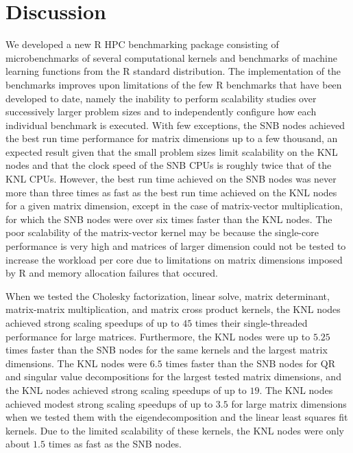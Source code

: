 \section{Discussion} \label{sec:discuss}
We developed a new R HPC benchmarking package consisting of microbenchmarks of
  several computational kernels and benchmarks of machine learning functions
  from the R standard distribution.
The implementation of the benchmarks improves upon limitations of the few R
  benchmarks that have been developed to date, namely the inability to perform
  scalability studies over successively larger problem sizes and to
  independently configure how each individual benchmark is executed.
With few exceptions, the SNB nodes achieved the best run time
  performance for matrix dimensions up to a few thousand, an expected result
  given that the small problem sizes limit scalability on the KNL nodes
  and that the clock speed of the SNB CPUs is roughly twice that of
  the KNL CPUs.
However, the best run time achieved on the SNB nodes was never more
  than three times as fast as the best run time achieved on the KNL
  nodes for a given matrix dimension, except in the case of matrix-vector
  multiplication, for which the SNB nodes were over six times faster
  than the KNL nodes.
The poor scalability of the matrix-vector kernel may be because the single-core
  performance is very high and matrices of larger dimension could not be
  tested to increase the workload per core due to limitations on matrix dimensions
  imposed by R and memory allocation failures that occured.

When we tested the Cholesky factorization, linear solve, matrix
  determinant, matrix-matrix multiplication, and matrix cross product kernels,
  the KNL nodes achieved strong scaling speedups of up to $45$ times
  their single-threaded performance for large matrices.
Furthermore, the KNL nodes were up to $5.25$ times faster than the SNB nodes
  for the same kernels and the largest matrix dimensions.
The KNL nodes were $6.5$ times faster than the SNB nodes for QR and singular
  value decompositions for the largest tested matrix dimensions, and the KNL
  nodes achieved strong scaling speedups of up to $19$.
The KNL nodes achieved modest strong scaling speedups of up to $3.5$
  for large matrix dimensions when we tested them with the eigendecomposition
  and the linear least squares fit kernels.
Due to the limited scalability of these kernels, the KNL nodes were only about
  $1.5$ times as fast as the SNB nodes.

